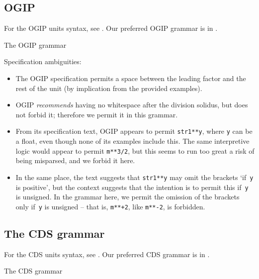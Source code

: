 \documentclass[11pt,notitlepage,onecolumn]{ivoa}
\begin{document}
\subsection{OGIP}
\label{appx:ogipgrammar}

For the OGIP units syntax, see \cite{george95}.  Our preferred OGIP
grammar is in .

\begin{table}

\caption{\label{tabx:ogipgrammar}The OGIP grammar}
\end{table}

Specification ambiguities:
\begin{itemize}
\item The OGIP specification permits a space between the leading
  factor and the rest of the unit (by implication from the provided
  examples).
\item OGIP \emph{recommends} having no whitespace after the division
  solidus, but does not forbid it; therefore we permit it in this
  grammar.
\item From its specification text, OGIP appears to permit
  \texttt{str1**y}, where \texttt{y} can be a float, even though none
  of its examples include this.  The same interpretive logic would
  appear to permit \texttt{m**3/2}, but this seems to run too great a
  risk of being misparsed, and we forbid it here.
\item In the same place, the text suggests that \texttt{str1**y} may
  omit the brackets `if~\texttt y is positive', but the context
  suggests that the intention is to permit this if~\texttt y is
  unsigned.  In the grammar here, we permit the omission of the
  brackets only if~\texttt y is unsigned -- that is, \texttt{m**+2},
  like \texttt{m**-2}, is forbidden.
\end{itemize}

\subsection{The CDS grammar}
\label{appx:cdsgrammar}

For the CDS units syntax, see \cite[\S3.2]{cds00}.  Our preferred CDS
grammar is in .

\begin{table}

\caption{\label{tabx:cdsgrammar}The CDS grammar}
\end{table}
\end{document}
